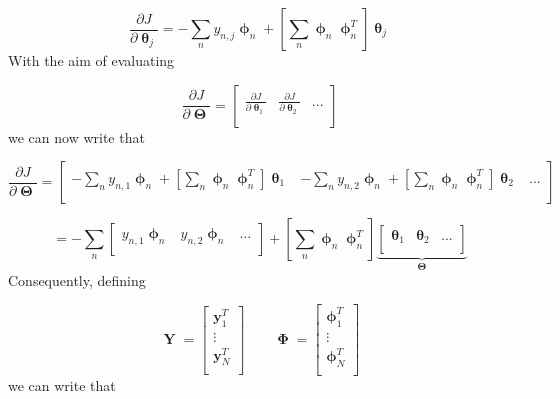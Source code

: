\documentclass[a4paper, 11pt]{article}
\DeclareMathOperator{\y}{\boldsymbol{y}}
\DeclareMathOperator{\Y}{\boldsymbol{Y}}
\DeclareMathOperator{\pa}{\boldsymbol{\theta}}
\DeclareMathOperator{\Pa}{\boldsymbol{\Theta}}
\DeclareMathOperator{\bphi}{\boldsymbol{\phi}}
\DeclareMathOperator{\bPhi}{\boldsymbol{\Phi}}
\begin{document}
\begin{equation}
	\frac{\partial J}{\partial \pa_j} = -\sum_n y_{n,j} \bphi_n + 
	\left[
		\sum_n \bphi_n \bphi_n^T
	\right] \pa_j
\end{equation}
With the aim of evaluating

\begin{equation}
	\frac{\partial J}{\partial \Pa} = 
	\left[
		\begin{array}{ccc}
			\frac{\partial J}{\partial \pa_1} & 
			\frac{\partial J}{\partial \pa_2} & 
			... \\
		\end{array}
	\right]
\end{equation}
we can now write that

\begin{equation}
	\frac{\partial J}{\partial \Pa} = 
	\left[
		\begin{array}{ccc}
			- \sum_n y_{n,1} \bphi_n + \left[ \sum_n \bphi_n \bphi_n^T \right] \pa_1 &
			- \sum_n y_{n,2} \bphi_n + \left[ \sum_n \bphi_n \bphi_n^T \right] \pa_2 & 
			... \\
		\end{array}
	\right]
\end{equation}

\begin{equation}
	= - \sum_n \left[
		\begin{array}{ccc}
			y_{n,1} \bphi_n & 
			y_{n,2} \bphi_n & 
			... \\
		\end{array}
	\right] + 
	\left[ \sum_n \bphi_n \bphi_n^T \right] 
	\underbrace{
	\left[
		\begin{array}{ccc}
			\pa_1 & \pa_2 & ... \\
		\end{array}
	\right]
	}_{\Pa}
\end{equation}
Consequently, defining

\begin{equation}
	\Y = \left[
		\begin{array}{c}
			\y_1^T \\
			\vdots \\
			\y_N^T \\
		\end{array}
	\right] \qquad
	\bPhi = \left[
		\begin{array}{c}
			\bphi_1^T \\
			\vdots \\
			\bphi_N^T \\
		\end{array}
	\right]
\end{equation}
we can write that
\end{document}
